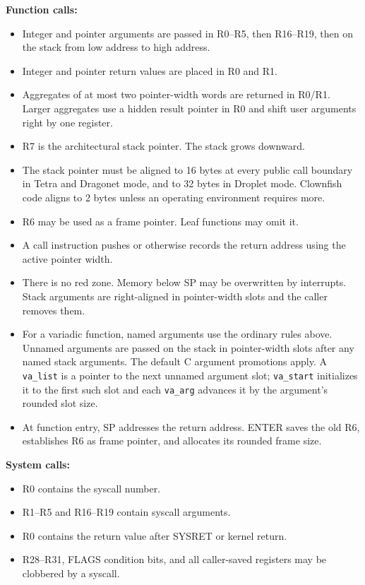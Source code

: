 \documentclass[11pt]{article}
\begin{document}
\textbf{Function calls:}
\begin{itemize}
    \item Integer and pointer arguments are passed in R0--R5, then R16--R19, then on the stack from low address to high address.
    \item Integer and pointer return values are placed in R0 and R1.
    \item Aggregates of at most two pointer-width words are returned in R0/R1. Larger aggregates use a hidden result pointer in R0 and shift user arguments right by one register.
    \item R7 is the architectural stack pointer. The stack grows downward.
    \item The stack pointer must be aligned to 16 bytes at every public call boundary in Tetra and Dragonet mode, and to 32 bytes in Droplet mode. Clownfish code aligns to 2 bytes unless an operating environment requires more.
    \item R6 may be used as a frame pointer. Leaf functions may omit it.
    \item A call instruction pushes or otherwise records the return address using the active pointer width.
    \item There is no red zone. Memory below SP may be overwritten by interrupts. Stack arguments are right-aligned in pointer-width slots and the caller removes them.
    \item For a variadic function, named arguments use the ordinary rules above.
    Unnamed arguments are passed on the stack in pointer-width slots after any
    named stack arguments. The default C argument promotions apply. A
    \texttt{va\_list} is a pointer to the next unnamed argument slot;
    \texttt{va\_start} initializes it to the first such slot and each
    \texttt{va\_arg} advances it by the argument's rounded slot size.
    \item At function entry, SP addresses the return address. ENTER saves the old R6, establishes R6 as frame pointer, and allocates its rounded frame size.
\end{itemize}

\textbf{System calls:}
\begin{itemize}
    \item R0 contains the syscall number.
    \item R1--R5 and R16--R19 contain syscall arguments.
    \item R0 contains the return value after SYSRET or kernel return.
    \item R28--R31, FLAGS condition bits, and all caller-saved registers may be clobbered by a syscall.
\end{itemize}
\end{document}
